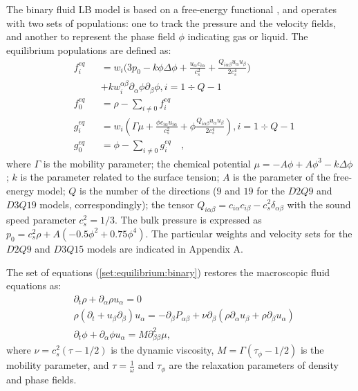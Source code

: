 \documentclass{article}
\begin{document}
The binary fluid LB model is
based on a free-energy functional \cite{swift,landau}, and operates with two
sets of populations: one to track the pressure and the velocity fields, and another to represent the
phase field $\phi$ indicating gas or liquid.
The equilibrium populations \cite{pooley-contact} are defined as:
\begin{equation}
\label{set:equilibrium:binary}
\begin{aligned}
&f_i^{eq}&&=w_i 
\biggl(3
p_0 - k \phi \Delta \phi
+\frac{u_{\alpha}c_{i\alpha}}{c_s^2}+\frac{Q_{i\alpha\beta}u_{\alpha } u_ {
\beta}}{2 c_s^4}\biggr)\\
&&&+k w_i^{\alpha\beta} \partial_{\alpha} \phi\partial_{\beta} \phi, i=1\div Q-1\\
&f_0^{eq}&&=\rho-\sum_{i\neq0}{f_i^{eq}}\\
&g_i^{eq}&&=w_i\left(\Gamma \mu + \frac{\phi c_{i\alpha} u_{i\alpha}}{c_s^2}+\phi
\frac{Q_{i\alpha\beta}u_{\alpha}u_{\beta}}{2 c_s^4}\right), i=1\div Q-1\\
&g_0^{eq}&&=\phi-\sum_{i\neq0}{g_i^{eq}}\quad,
\end{aligned}
\end{equation}
where $\Gamma$ is the mobility parameter; the chemical potential
$\mu=-A\phi+A\phi^3-k\Delta\phi$; $k$ is the parameter related to the surface
tension; $A$ is the parameter of the free-energy model; $Q$ is the number of the directions ($9$ and
$19$ for the $D2Q9$ and $D3Q19$ models, correspondingly); the tensor
$Q_{i\alpha\beta}=c_{i\alpha} c_{i\beta} - c_s^2 \delta_{\alpha\beta}$ with
the sound speed parameter $c_s^2=1/3$. The bulk pressure
is expressed as $p_0=c_s^2 \rho +A (-0.5 \phi^2+0.75 \phi^4)$. The particular weights and velocity
sets for the $D2Q9$ and $D3Q15$ models are indicated in Appendix A. 

The set of equations (\ref{set:equilibrium:binary}) restores the macroscopic
fluid equations as:
\begin{equation}
\begin{aligned}
&\partial_t \rho+ \partial_{\alpha} \rho u_{\alpha}=0\\
&\rho\left(\partial_t+u_{\beta}\partial_{\beta}\right) u_{\alpha}=
-\partial_{\beta}P_{\alpha \beta} +
\nu\partial_{\beta}\left(\rho\partial_{\alpha}u_{\beta}+\rho\partial_{\beta} u_{\alpha}\right)\\
&\partial_t \phi + \partial_{\alpha} \phi u_{\alpha}=M \partial^2_{\beta\beta} \mu,
\end{aligned}
\label{binary:fluid:system}
\end{equation}
where $\nu=c_s^2 (\tau-1/2)$ is the dynamic viscosity,
$M=\Gamma(\tau_{\phi}-1/2)$ is the mobility parameter, and $\tau=\frac{1}{\omega}$ and $\tau_{\phi}$
are the relaxation parameters of density and phase fields. 
\end{document}
